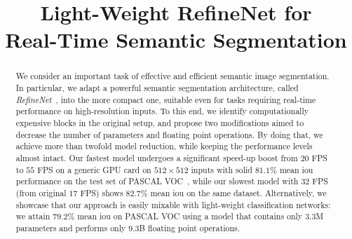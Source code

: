 \documentclass{bmvc2k}
\title{Light-Weight RefineNet for\\ Real-Time Semantic Segmentation}
\begin{document}
\makeatletter
{}
\makeatother

\renewcommand{\partname}{}

\maketitle
\vspace{-0.25in}
\begin{abstract}
We consider an important task of effective and efficient semantic image segmentation. In particular, we adapt a powerful semantic segmentation architecture, called \textit{RefineNet}~\cite{LinMSR17}, into the more compact one, suitable even for tasks requiring real-time performance on high-resolution inputs. To this end, we identify computationally expensive blocks in the original setup, and propose two modifications aimed to decrease the number of parameters and floating point operations. By doing that, we achieve more than twofold model reduction, while keeping the performance levels almost intact. Our fastest model undergoes a significant speed-up boost from $20$ FPS to $55$ FPS on a generic GPU card on $512\times512$ inputs with solid $81.1\%$ mean iou performance on the test set of PASCAL VOC~\cite{EveringhamGWWZ10}, while our slowest model with $32$ FPS (from original $17$ FPS) shows $82.7\%$ mean iou on the same dataset. Alternatively, we showcase that our approach is easily mixable with light-weight classification networks: we attain $79.2\%$ mean iou on PASCAL VOC using a model that contains only $3.3$M parameters and performs only $9.3$B floating point operations.
\end{abstract}
\vspace{-0.25in}
\end{document}

